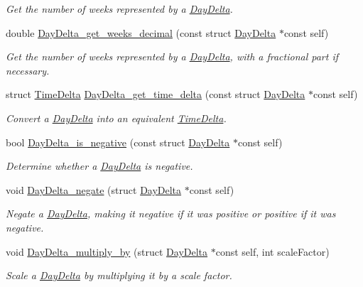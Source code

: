 \begin{DoxyCompactItemize}
\begin{DoxyCompactList}\small\item\em \-Get the number of weeks represented by a \hyperlink{structDayDelta}{\-Day\-Delta}. \end{DoxyCompactList}\item 
double \hyperlink{day-delta_8h_a62efa797217bb961a560f07cf25d4462}{\-Day\-Delta\-\_\-get\-\_\-weeks\-\_\-decimal} (const struct \hyperlink{structDayDelta}{\-Day\-Delta} $\ast$const self)
\begin{DoxyCompactList}\small\item\em \-Get the number of weeks represented by a \hyperlink{structDayDelta}{\-Day\-Delta}, with a fractional part if necessary. \end{DoxyCompactList}\item 
struct \hyperlink{structTimeDelta}{\-Time\-Delta} \hyperlink{day-delta_8h_a62765dd1d10d3358a5b41469ef9520a6}{\-Day\-Delta\-\_\-get\-\_\-time\-\_\-delta} (const struct \hyperlink{structDayDelta}{\-Day\-Delta} $\ast$const self)
\begin{DoxyCompactList}\small\item\em \-Convert a \hyperlink{structDayDelta}{\-Day\-Delta} into an equivalent \hyperlink{structTimeDelta}{\-Time\-Delta}. \end{DoxyCompactList}\item 
bool \hyperlink{day-delta_8h_a4b104966e921d8b90ce0c1094861b9b2}{\-Day\-Delta\-\_\-is\-\_\-negative} (const struct \hyperlink{structDayDelta}{\-Day\-Delta} $\ast$const self)
\begin{DoxyCompactList}\small\item\em \-Determine whether a \hyperlink{structDayDelta}{\-Day\-Delta} is negative. \end{DoxyCompactList}\item 
void \hyperlink{day-delta_8h_a9deb74bc8d748a21449a16e658f16432}{\-Day\-Delta\-\_\-negate} (struct \hyperlink{structDayDelta}{\-Day\-Delta} $\ast$const self)
\begin{DoxyCompactList}\small\item\em \-Negate a \hyperlink{structDayDelta}{\-Day\-Delta}, making it negative if it was positive or positive if it was negative. \end{DoxyCompactList}\item 
void \hyperlink{day-delta_8h_ad41c3944938dda1471842ff64055591e}{\-Day\-Delta\-\_\-multiply\-\_\-by} (struct \hyperlink{structDayDelta}{\-Day\-Delta} $\ast$const self, int scale\-Factor)
\begin{DoxyCompactList}\small\item\em \-Scale a \hyperlink{structDayDelta}{\-Day\-Delta} by multiplying it by a scale factor. \end{DoxyCompactList}\item 

\end{DoxyCompactItemize}
